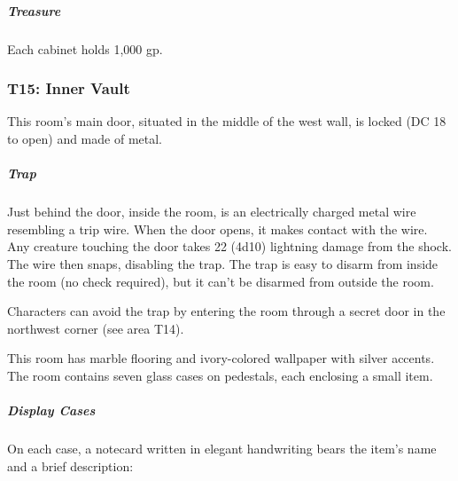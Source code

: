 \documentclass[10pt,a4paper,twoside,bg=print,twocolumn,openany,nodeprecatedcode]{dndbook}
\begin{document}
\subparagraph{Treasure}
Each cabinet holds 1,000 gp.

\subsubsection{T15: Inner Vault}
This room's main door, situated in the middle of the west wall, is locked (DC 18 to open) and made of metal.

\subparagraph{Trap}
Just behind the door, inside the room, is an electrically charged metal wire resembling a trip wire. When the door opens, it makes contact with the wire. Any creature touching the door takes 22 (4d10) lightning damage from the shock. The wire then snaps, disabling the trap. The trap is easy to disarm from inside the room (no check required), but it can't be disarmed from outside the room.

Characters can avoid the trap by entering the room through a secret door in the northwest corner (see area T14).

\begin{DndReadAloud}{}
This room has marble flooring and ivory-colored wallpaper with silver accents. The room contains seven glass cases on pedestals, each enclosing a small item.

\end{DndReadAloud}

\subparagraph{Display Cases}
On each case, a notecard written in elegant handwriting bears the item's name and a brief description:
\end{document}

